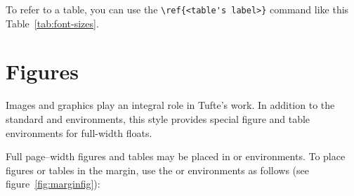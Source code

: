 
To refer to a table, you can use the \verb+\ref{<table's label>}+ command like this Table~\ref{tab:font-sizes}.



\section{Figures}
Images and graphics play an integral role in Tufte's work.
In addition to the standard  and  environments,
this style provides special figure and table environments for full-width
floats.

Full page--width figures and tables may be placed in  or
 environments.  To place figures or tables in the margin,
use the  or  environments as follows
(see figure~\ref{fig:marginfig}):

